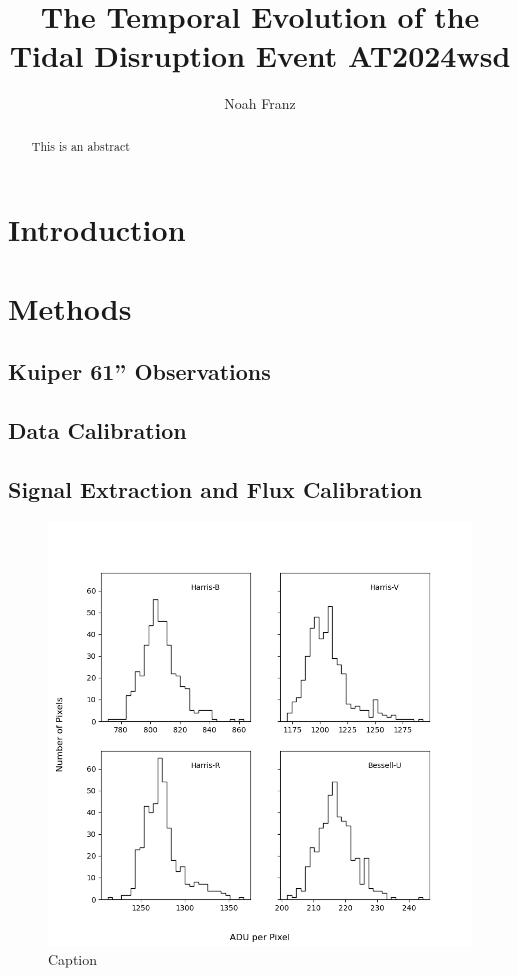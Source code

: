 \documentclass{aastex631}
\begin{document}


\title{The Temporal Evolution of the Tidal Disruption Event AT2024wsd}

\author[0000-0003-4537-3575]{Noah Franz}

\begin{abstract}
  This is an abstract
\end{abstract}

\section{Introduction}

\section{Methods}
\subsection{Kuiper 61'' Observations}
\subsection{Data Calibration}

\subsection{Signal Extraction and Flux Calibration}

\begin{figure}
  \includegraphics[width=\textwidth]{../analysis/aperture-counts-hist.png}
  \caption{Caption}
  \label{fig:aperture-counts}
\end{figure}
\end{document}
